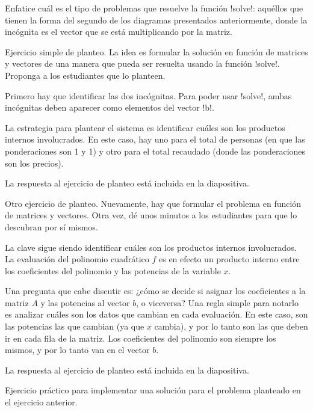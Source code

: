 \documentclass[10pt]{article}
\begin{document}
  Enfatice cuál es el tipo de problemas que resuelve la función \li!solve!:
  aquéllos que tienen la forma del segundo de los diagramas presentados anteriormente,
  donde la incógnita es el vector que se está multiplicando por la matriz.


  Ejercicio simple de planteo.
  La idea es formular la solución en función de matrices y vectores
  de una manera que pueda ser resuelta usando la función \li!solve!.
  Proponga a los estudiantes que lo planteen.

  Primero hay que identificar las dos incógnitas.
  Para poder usar \li!solve!, ambas incógnitas deben aparecer
  como elementos del vector \li!b!.

  La estrategia para plantear el sistema
  es identificar cuáles son los productos internos involucrados.
  En este caso, hay uno para el total de personas
  (en que las ponderaciones son 1 y 1)
  y otro para el total recaudado
  (donde las ponderaciones son los precios).

  La respuesta al ejercicio de planteo está incluida en la diapositiva.


  Otro ejercicio de planteo.
  Nuevamente, hay que formular el problema
  en función de matrices y vectores.
  Otra vez, dé unos minutos a los estudiantes para que lo descubran por sí mismos.

  La clave sigue siendo identificar
  cuáles son los productos internos involucrados.
  La evaluación del polinomio cuadrático \(f\)
  es en efecto un producto interno
  entre los coeficientes del polinomio
  y las potencias de la variable \(x\).

  Una pregunta que cabe discutir es:
  ¿cómo se decide si asignar los coeficientes a la matriz \(A\)
  y las potencias al vector \(b\), o viceversa?
  Una regla simple para notarlo es
  analizar cuáles son los datos que cambian en cada evaluación.
  En este caso, son las potencias las que cambian (ya que \(x\) cambia),
  y por lo tanto son las que deben ir en cada fila de la matriz.
  Los coeficientes del polinomio son siempre los mismos,
  y por lo tanto van en el vector \(b\).

  La respuesta al ejercicio de planteo está incluida en la diapositiva.


  Ejercicio práctico para implementar una solución
  para el problema planteado en el ejercicio anterior.
\end{document}
